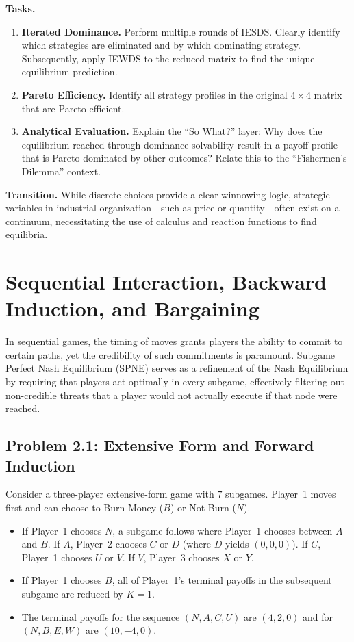 \documentclass[12pt,a4paper]{article}
\begin{document}
\noindent\textbf{Tasks.}
\begin{enumerate}
  \item \textbf{Iterated Dominance.} Perform multiple rounds of IESDS. Clearly identify which strategies are eliminated and by which dominating strategy. Subsequently, apply IEWDS to the reduced matrix to find the unique equilibrium prediction.
  \item \textbf{Pareto Efficiency.} Identify all strategy profiles in the original \(4\times 4\) matrix that are Pareto efficient.
  \item \textbf{Analytical Evaluation.} Explain the ``So What?'' layer: Why does the equilibrium reached through dominance solvability result in a payoff profile that is Pareto dominated by other outcomes? Relate this to the ``Fishermen's Dilemma'' context.
\end{enumerate}

\bigskip
\noindent\textbf{Transition.} While discrete choices provide a clear winnowing logic, strategic variables in industrial organization---such as price or quantity---often exist on a continuum, necessitating the use of calculus and reaction functions to find equilibria.

\section{Sequential Interaction, Backward Induction, and Bargaining}

In sequential games, the timing of moves grants players the ability to commit to certain paths, yet the credibility of such commitments is paramount. Subgame Perfect Nash Equilibrium (SPNE) serves as a refinement of the Nash Equilibrium by requiring that players act optimally in every subgame, effectively filtering out non-credible threats that a player would not actually execute if that node were reached.

\subsection*{Problem 2.1: Extensive Form and Forward Induction}

Consider a three-player extensive-form game with \(7\) subgames. Player~1 moves first and can choose to Burn Money (\(B\)) or Not Burn (\(N\)).
\begin{itemize}
  \item If Player~1 chooses \(N\), a subgame follows where Player~1 chooses between \(A\) and \(B\). If \(A\), Player~2 chooses \(C\) or \(D\) (where \(D\) yields \((0,0,0)\)). If \(C\), Player~1 chooses \(U\) or \(V\). If \(V\), Player~3 chooses \(X\) or \(Y\).
  \item If Player~1 chooses \(B\), all of Player~1's terminal payoffs in the subsequent subgame are reduced by \(K = 1\).
  \item The terminal payoffs for the sequence \((N, A, C, U)\) are \((4, 2, 0)\) and for \((N, B, E, W)\) are \((10, -4, 0)\).
\end{itemize}
\end{document}
